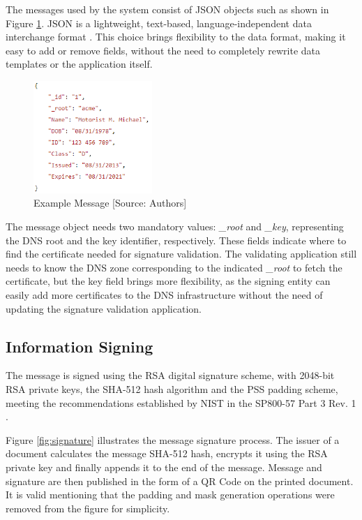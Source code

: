\documentclass[12pt]{article}
\begin{document}
The messages used by the system consist of JSON objects such as shown in Figure \ref{fig:json}. JSON is a lightweight, text-based, language-independent data interchange format \cite{bray2014javascript}. This choice brings flexibility to the data format, making it easy to add or remove fields, without the need to completely rewrite data templates or the application itself.

\begin{figure}[ht]
    \centering
    \includegraphics[width=0.4\textwidth]{json.png}
    \caption{Example Message [Source: Authors]}
    \label{fig:json}
\end{figure}

The message object needs two mandatory values: \textit{\_root} and \textit{\_key}, representing the DNS root and the key identifier, respectively. These fields indicate where to find the certificate needed for signature validation. The validating application still needs to know the DNS zone corresponding to the indicated \textit{\_root} to fetch the certificate, but the key field brings more flexibility, as the signing entity can easily add more certificates to the DNS infrastructure without the need of updating the signature validation application. 

\subsection{Information Signing}

The message is signed using the RSA digital signature scheme, with 2048-bit RSA private keys, the SHA-512 hash algorithm and the PSS padding scheme, meeting the recommendations established by NIST in the SP800-57 Part 3 Rev. 1 \cite{nist800}.

Figure \ref{fig:signature} illustrates the message signature process. The issuer of a document calculates the message SHA-512 hash, encrypts it using the RSA private key and finally appends it to the end of the message. Message and signature are then published in the form of a QR Code on the printed document. It is valid mentioning that the padding and mask generation operations were removed from the figure for simplicity.
\end{document}
